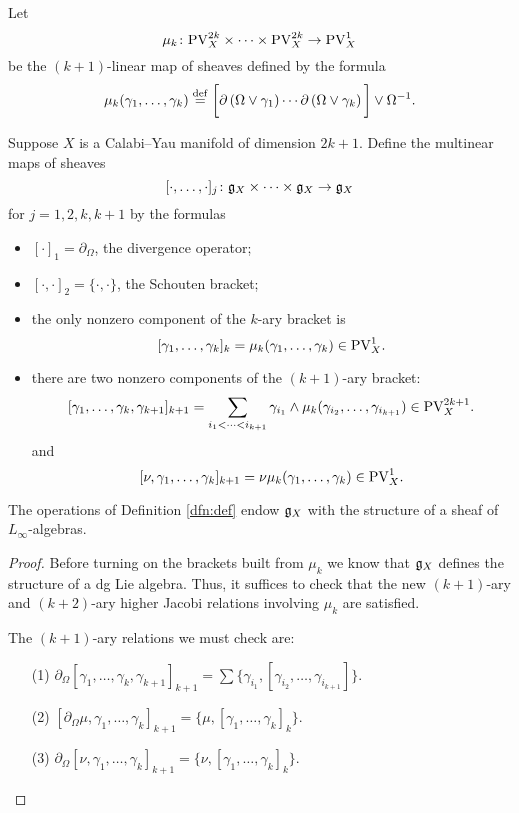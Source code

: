 \documentclass[11pt]{amsart}
\numberwithin{equation}{section}
\def\PV{{\rm PV}}
\def\div{\partial_\Omega}
\begin{document}
\begin{dfn}
Let
\[
\mu_k \colon \PV^{2k}_X \times \cdots \times \PV^{2k}_X \to \PV^1_X 
\]
be the $(k+1)$-linear map of sheaves defined by the formula
\[
\mu_k (\gamma_1,\ldots, \gamma_k) \overset{\rm def}{=} \bigg[\partial \left(\Omega \vee \gamma_1\right)\cdots \partial \left(\Omega \vee \gamma_k\right)\bigg] \vee \Omega^{-1} .
\]
\end{dfn}

\begin{dfn}
\label{dfn:def}
Suppose $X$ is a Calabi--Yau manifold of dimension $2k+1$. 
Define the multinear maps of sheaves
\[
[\cdot, \ldots, \cdot]_j \colon \mathfrak g_X \times \cdots \times \mathfrak g_X \to \mathfrak g_X
\]
for $j=1,2,k,k+1$ by the formulas
\begin{itemize}
\item $[\cdot]_1 = \partial_\Omega$, the divergence operator;
\item $[\cdot,\cdot]_2 = \{\cdot,\cdot\}$, the Schouten bracket;
\item the only nonzero component of the $k$-ary bracket is
\[
[\gamma_1,\ldots, \gamma_k]_k = \mu_k(\gamma_1,\ldots, \gamma_k) \in \PV^1_X .
\]
\item there are two nonzero components of the $(k+1)$-ary bracket:
\[
[\gamma_1,\ldots, \gamma_k, \gamma_{k+1}]_{k+1} = \sum_{i_1 < \cdots < i_{k+1}} \gamma_{i_1} \wedge \mu_k(\gamma_{i_2},\ldots, \gamma_{i_{k+1}}) \in \PV^{2k+1}_X .
\]
and 
\[
[\nu, \gamma_1, \ldots, \gamma_k]_{k+1} = \nu \mu_k (\gamma_1,\ldots, \gamma_k) \in \PV^{1}_X .
\]
\end{itemize}
\end{dfn}

\begin{thm}
The operations of Definition \ref{dfn:def} endow $\mathfrak g_X$ with the structure of a sheaf of $L_\infty$-algebras.
\end{thm}

\begin{proof}
Before turning on the brackets built from $\mu_k$ we know that $\mathfrak g_X$ defines the structure of a dg Lie algebra.
Thus, it suffices to check that the new $(k+1)$-ary and $(k+2)$-ary higher Jacobi relations involving $\mu_k$ are satisfied. 

The $(k+1)$-ary relations we must check are:
\begin{itemize}
\item[(1)] $\div [\gamma_1,\ldots, \gamma_k,\gamma_{k+1}]_{k+1} = \sum \{\gamma_{i_1}, [\gamma_{i_2},\ldots, \gamma_{i_{k+1}}]\}$. 
\item[(2)] $[\div \mu, \gamma_1, \ldots, \gamma_k]_{k+1} = \{\mu, [\gamma_1,\ldots, \gamma_k]_k\}$.
\item[(3)] $\div [\nu,\gamma_1,\ldots, \gamma_k]_{k+1} = \{\nu, [\gamma_1,\ldots, \gamma_{k}]_k\}$.
\end{itemize}
\end{proof}
\end{document}
